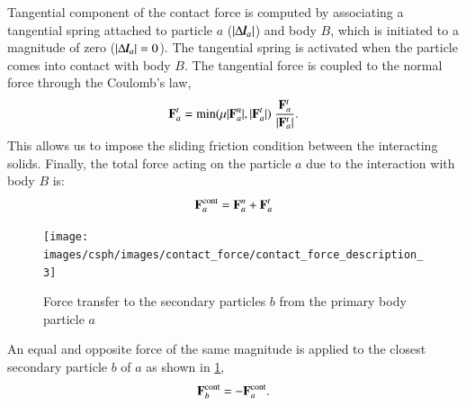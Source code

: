 Tangential component of the contact force is computed by associating a
tangential spring attached to particle $a$ ($|\Delta \textit{\textbf{l}}_a|$)
and body $B$, which is initiated to a magnitude of zero
($|\Delta \textit{\textbf{l}}_a|=0$). The tangential spring is activated when
the particle comes into contact with body $B$. The tangential force is coupled
to the normal force through the Coulomb's law,
\begin{equation}
  \label{eq:Coulomb-law}
  \mathbf{F}_{a}^{t} = \min(\mu |\mathbf{F}_{a}^{n}|, |\mathbf{F}_{a}^{t}|) \
  \frac{\mathbf{F}_{a}^{t}}{|\mathbf{F}_{a}^{t}|}.
\end{equation}
This allows us to impose the sliding friction condition between the
interacting solids. Finally, the total force acting on the particle $a$ due to
the interaction with body $B$ is:
\begin{equation}
  \label{eq:contact-force}
  \mathbf{F}_{a}^{\text{cont}} = \mathbf{F}_{a}^{n} + \mathbf{F}_{a}^{t}
\end{equation}

\begin{figure}[!htpb]
  \centering
  \texttt{[image: images/csph/images/contact\_force/contact\_force\_description\_3]}
  \caption{Force transfer to the secondary particles $b$ from the primary body particle $a$}
\label{fig:secondary_particle_contact_foce_transfer}
\end{figure}
An equal and opposite force of the same magnitude is applied to the closest
secondary particle $b$ of $a$ as shown in
\cref{fig:secondary_particle_contact_foce_transfer},
\begin{equation}
  \label{eq:contact-force}
  \mathbf{F}_{b}^{\text{cont}} = - \mathbf{F}_{a}^{\text{cont}}.
\end{equation}


\FloatBarrier%
